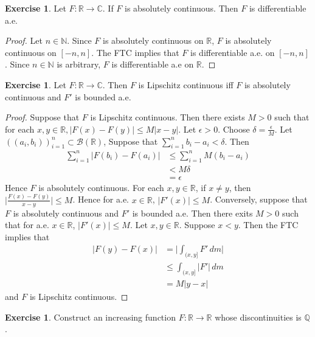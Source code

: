 \documentclass[12pt]{amsart}
\theoremstyle{definition}
\newtheorem{ex}[definition]{Exercise}
\newcommand{\del}{\delta}
\newcommand{\ep}{\epsilon}
\newcommand{\C}{\mathbb{C}}
\newcommand{\N}{\mathbb{N}}
\newcommand{\R}{\mathbb{R}}
\newcommand{\Q}{\mathbb{Q}}
\newcommand{\MB}{\mathcal{B}}
\newcommand{\dm}{\, d m}
\newcommand{\lex}[1]{\label{ex:#1}}
\begin{document}
	\begin{ex} \lex{00000} 
		Let $F: \R \rightarrow \C$. If $F$ is absolutely continuous. Then $F$ is differentiable a.e.
	\end{ex}
	
	\begin{proof}
		Let $n \in \N$. Since $F$ is absolutely continuous on $\R$, $F$ is absolutely continuous on $[-n,n]$. The FTC implies that $F$ is differentiable a.e. on $[-n,n]$. Since $n \in \N$ is arbitrary, $F$ is differentiable a.e on $\R$.
	\end{proof}
	
	\begin{ex} \lex{00000} 
		Let $F: \R \rightarrow \C$. Then $F$ is Lipschitz continuous iff $F$ is absolutely continuous and $F'$ is bounded a.e.
	\end{ex}
	
	\begin{proof}
		Suppose that $F$ is Lipschitz continuous. Then there exists $M>0$ such that for each $x,y \in \R, |F(x)-F(y)| \leq M|x-y|$. Let $\ep >0$. Choose $\del = \frac{\ep}{M}$. Let $((a_i, b_i))_{i=1}^n \subset \MB(\R)$, Suppose that $\sum_{i=1}^n b_i-a_i < \del$. Then 
		\begin{align*}
			\sum_{i=1}^n|F(b_i)-F(a_i)| 
			&\leq \sum_{i=1}^n M(b_i - a_i)\\
			&< M\del\\
			&= \ep
		\end{align*}
		Hence $F$ is absolutely continuous. For each $x, y \in \R$, if $x \neq y$, then $\bigg|\frac{F(x)-F(y)}{x-y}\bigg| \leq M$. Hence for a.e. $x \in \R$, $|F'(x)| \leq M$. Conversely, suppose that $F$ is absolutely continuous and $F'$ is bounded a.e. Then there exits $M> 0$ such that for a.e. $x \in \R$, $|F'(x)| \leq M$. Let $x,y \in \R$. Suppose $x<y$. Then the FTC implies that 
		\begin{align*}
			|F(y)-F(x)|
			& = \bigg|\int_{(x,y]}F'\dm\bigg|\\
			&\leq \int_{(x,y]}|F'|\dm\\
			&=M|y-x|
		\end{align*}
		and $F$ is Lipschitz continuous.
	\end{proof}
	
	\begin{ex} \lex{00000} 
		Construct an increasing function $F: \R \rightarrow \R$ whose discontinuities is $\Q$.
	\end{ex}
	
\end{document}
